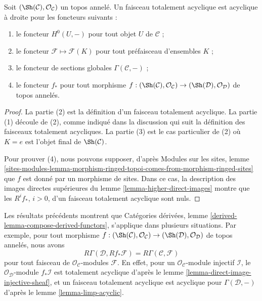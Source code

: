 \begin{lemma}
\label{lemma-limp-acyclic}
Soit $(\Sh(\mathcal{C}), \mathcal{O}_\mathcal{C})$ un topos annelé.
Un faisceau totalement acyclique est acyclique à droite pour les foncteurs
suivants :
\begin{enumerate}
\item le foncteur $H^0(U, -)$ pour tout objet $U$ de $\mathcal{C}$ ;
\item le foncteur $\mathcal{F} \mapsto \mathcal{F}(K)$ pour tout préfaisceau
d'ensembles $K$ ;
\item le foncteur de sections globales $\Gamma(\mathcal{C}, -)$ ;
\item le foncteur $f_*$ pour tout morphisme
$f : (\Sh(\mathcal{C}), \mathcal{O}_\mathcal{C}) \to
(\Sh(\mathcal{D}), \mathcal{O}_\mathcal{D})$ de topos annelés.
\end{enumerate}
\end{lemma}

\begin{proof}
La partie (2) est la définition d'un faisceau totalement acyclique.
La partie (1) découle de (2), comme indiqué dans la discussion qui suit la
définition des faisceaux totalement acycliques.
La partie (3) est le cas particulier de (2) où $K = e$ est l'objet final de
$\Sh(\mathcal{C})$.

\medskip\noindent
Pour prouver (4), nous pouvons supposer, d'après Modules sur les sites, lemme
\ref{sites-modules-lemma-morphism-ringed-topoi-comes-from-morphism-ringed-sites}
que $f$ est donné par un morphisme de sites. Dans ce cas, la description des
images directes supérieures du lemme \ref{lemma-higher-direct-images} montre
que les $R^if_*$, $i > 0$, d'un faisceau totalement acyclique sont nuls.
\end{proof}

\begin{remark}
\label{remark-before-Leray}
Les résultats précédents montrent que Catégories dérivées,
lemme \ref{derived-lemma-compose-derived-functors}, s'applique dans plusieurs
situations. Par exemple, pour tout morphisme
$f : (\Sh(\mathcal{C}), \mathcal{O}_\mathcal{C}) \to
(\Sh(\mathcal{D}), \mathcal{O}_\mathcal{D})$ de topos annelés, nous avons
$$
R\Gamma(\mathcal{D}, Rf_*\mathcal{F}) = R\Gamma(\mathcal{C}, \mathcal{F})
$$
pour tout faisceau de $\mathcal{O}_\mathcal{C}$-modules $\mathcal{F}$.
En effet, pour un $\mathcal{O}_\mathcal{C}$-module injectif $\mathcal{I}$, le
$\mathcal{O}_\mathcal{D}$-module $f_*\mathcal{I}$ est totalement acyclique
d'après le lemme \ref{lemma-direct-image-injective-sheaf}, et un faisceau
totalement acyclique est acyclique pour $\Gamma(\mathcal{D}, -)$ d'après le
lemme \ref{lemma-limp-acyclic}.
\end{remark}

